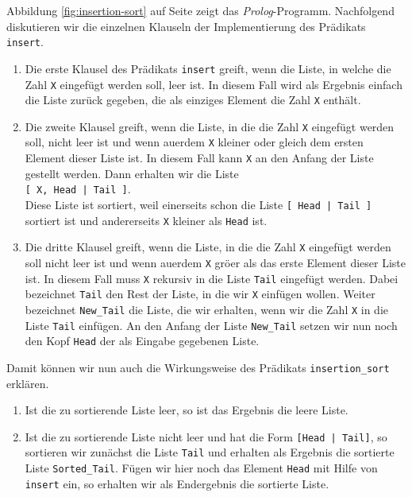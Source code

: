 Abbildung \ref{fig:insertion-sort} auf Seite \pageref{fig:insertion-sort} zeigt das \textsl{Prolog}-Programm. 
Nachfolgend diskutieren wir die einzelnen Klauseln der Implementierung des Pr\"{a}dikats \texttt{insert}.
\begin{enumerate}
\item Die erste Klausel des Pr\"{a}dikats \texttt{insert} greift, wenn die Liste, in welche die
      Zahl \texttt{X} eingef\"{u}gt werden soll, leer ist.
      In diesem Fall wird als Ergebnis einfach die Liste zur\"{u}ck gegeben, die als einziges Element
      die Zahl \texttt{X} enth\"{a}lt.
\item Die zweite Klausel greift, wenn die Liste, in die die Zahl  \texttt{X} eingef\"{u}gt
      werden soll, nicht leer ist und wenn au\3erdem
       \texttt{X} kleiner oder gleich dem ersten Element dieser Liste ist.  In diesem Fall kann \texttt{X} an den Anfang der 
      Liste gestellt werden. Dann erhalten wir die Liste \\[0.2cm]
      \hspace*{1.3cm} \texttt{[ X, Head | Tail ]}. \\[0.2cm]
      Diese Liste ist sortiert, weil einerseits schon die Liste \texttt{[ Head | Tail ]} sortiert ist
      und andererseits \texttt{X} kleiner als \texttt{Head} ist.
\item Die dritte Klausel greift, wenn die Liste, in die die Zahl  \texttt{X} eingef\"{u}gt
      werden soll  nicht leer ist und wenn au\3erdem \texttt{X} gr\"{o}\3er als das erste
      Element dieser Liste ist.  In diesem Fall muss \texttt{X} rekursiv
      in die Liste \texttt{Tail} eingef\"{u}gt werden.  Dabei bezeichnet \texttt{Tail} den
      Rest der Liste, in die wir \texttt{X} einf\"{u}gen wollen.
      Weiter bezeichnet \texttt{New\_Tail} die Liste, die wir erhalten, wenn wir die Zahl
      \texttt{X} in die Liste \texttt{Tail} einf\"{u}gen.
      An den Anfang der  Liste \texttt{New\_Tail} setzen wir nun noch den Kopf
      \texttt{Head} der als Eingabe gegebenen Liste.
\end{enumerate}
Damit k\"{o}nnen wir nun auch die Wirkungsweise des Pr\"{a}dikats \texttt{insertion\_sort} erkl\"{a}ren.
\begin{enumerate}
\item Ist die zu sortierende Liste leer, so ist das Ergebnis die leere Liste.
\item Ist die zu sortierende Liste nicht leer und hat die Form \texttt{[Head | Tail]}, so sortieren wir zun\"{a}chst die
      Liste \texttt{Tail} und erhalten als Ergebnis die sortierte Liste \texttt{Sorted\_Tail}.  F\"{u}gen wir hier
      noch das Element \texttt{Head} mit Hilfe von \texttt{insert} ein, so erhalten wir als Endergebnis
      die sortierte Liste.
\end{enumerate}

